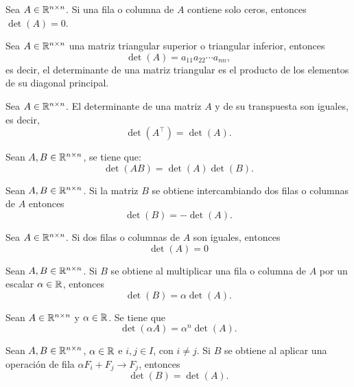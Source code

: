 \documentclass[a4,11pt]{aleph-notas}
\begin{document}
\begin{teo}
    Sea $A \in \Mat[\R]{n}{n}$. Si una fila o columna de $A$ contiene solo ceros, entonces $\det (A) =0$.
\end{teo}


\begin{teo}
    Sea $A \in \Mat[\R]{n}{n}$ una matriz triangular superior o triangular inferior, entonces
    \[
        \det(A) = a_{11}a_{22} \cdots a_{nn},
    \]
    es decir, el determinante de una matriz triangular es el producto de los elementos de su diagonal principal.
\end{teo}

\begin{teo}
    Sea $A \in \Mat[\R]{n}{n}$. El determinante de una matriz $A$ y de su transpuesta son iguales, es decir, 
    \[
        \det(A^\intercal) = \det(A).
    \]
\end{teo}

\begin{teo}
    Sean $A, B\in \Mat[\R]{n}{n}$, se tiene que:
    \[
        \det(AB) = \det(A)\det(B).
    \]
\end{teo}


\begin{teo}
    Sean $A, B \in \Mat[\R]{n}{n}$. Si la matriz $B$ se obtiene intercambiando dos filas o columnas de $A$ entonces
    \[  
        \det(B) = - \det(A).
    \]
\end{teo}

\begin{teo}
    Sea $A \in \Mat[\R]{n}{n}$. Si dos filas o columnas de $A$ son iguales, entonces 
    \[
        \det(A) = 0
    \]
\end{teo}

\begin{teo}
    Sean $A, B \in \Mat[\R]{n}{n}$. Si $B$ se obtiene al multiplicar una fila o columna de $A$ por un escalar $\alpha \in \R$, entonces
    \[
        \det(B) = \alpha \det(A).
    \]
\end{teo}


\begin{teo}
    Sean $A\in \Mat[\R]{n}{n}$ y $\alpha \in\R$. Se tiene que
    \[
        \det(\alpha A) = \alpha^n \det(A).
    \]
\end{teo}

\begin{teo}
    Sean $A, B \in \Mat[\R]{n}{n}$, $\alpha\in\R$ e $i,j\in I$, con $i\neq j$. Si $B$ se obtiene al aplicar una operación de fila $\alpha F_i + F_j \to F_j$, entonces 
    \[
        \det(B) = \det(A).
    \]
\end{teo}
\end{document}
